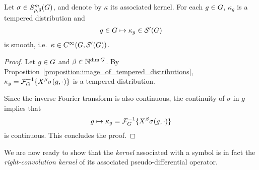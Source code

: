 \begin{lemma}
    Let $\sigma \in S^{m}_{\rho, \delta}(G)$,
    and denote by $\kappa$ its associated kernel.
    For each $g \in G$,
    $\kappa_g$ is a tempered distribution and
    \begin{align*}
        g \in G \mapsto \kappa_g \in {\mathcal{S}' (G)}
    \end{align*}
    is smooth,
    i.e.\ $\kappa \in {C^\infty(G, {\mathcal{S}' (G)})}$.
\end{lemma}
\begin{proof}
    Let $g \in G$ and $\beta \in \mathbb{N}^{\dim G}$.
    By Proposition~\ref{proposition:image_of_tempered_distributions},
    $\kappa_g = \InverseFourier \{\LeftDifferentialOperator \beta \sigma(g, \dummy)\}$ is a tempered distribution.

    Since the inverse Fourier transform is also continuous,
    the continuity of $\sigma$ in $g$ implies that
    \begin{align*}
        g \mapsto \kappa_g = \InverseFourier \{\LeftDifferentialOperator \beta \sigma(g, \dummy)\}
    \end{align*}
    is continuous.
    This concludes the proof.
\end{proof}

We are now ready to show that the \emph{kernel} associated with a symbol
is in fact the \emph{right-convolution kernel} of its associated pseudo-differential operator.

